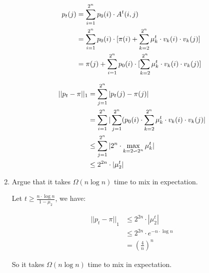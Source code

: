 \begin{enumerate}
  \begin{align}
    p_t(j) &= \sum\limits_{i=1}^{2^n} p_0(i) \cdot A^t(i,j) \notag \\
    &= \sum\limits_{i=1}^{2^n} p_0(i) \cdot [\pi(i)+ \sum\limits_{k=2}^{2^n}\mu_k^t \cdot v_k(i) \cdot v_k(j)] \notag \\
    &= \pi(j)+\sum_{i=1}^{2^n} p_0(i) \cdot [\sum\limits_{k=2}^{2^n}\mu_k^t \cdot v_k(i) \cdot v_k(j)]
  \end{align}

  \begin{align}
    ||p_t-\pi||_{1} &= \sum\limits_{j=1}^{2^n} |p_t(j) - \pi(j)| \notag \\
    &= \sum\limits_{i=1}^{2^n} |\sum\limits_{j=1}^{2^n} (p_0(i) \cdot \sum\limits_{k=2}^{2^n} \mu_k^t \cdot v_k(i) \cdot v_k(j) | \notag \\
    &\leq \sum\limits_{j=1}^{2^n} |2^n \cdot \max\limits_{k=2 \backsim 2^n} \mu_k^t| \notag \\
    & \leq 2^{2n} \cdot |\mu_2^t |
  \end{align}

  \item Argue that it takes $\Omega(n\log n)$ time to mix in expectation.
  
  \Answer

  Let $t \geq \frac{n \cdot \log n}{1-\mu_2}$, we have:

 \begin{equation}
 \begin{aligned}
    {||p_t-\pi ||}_1 & \leq 2^{2 n} \cdot |\mu_2^t| \\
  & \leq 2^{2 n} \cdot e^{-n \cdot \log n} \\
  &=\left(\frac{4}{n}\right)^n
 \end{aligned}
 \end{equation}

 So it takes $\Omega(n \log n)$ time to mix in expectation.

\end{enumerate}

